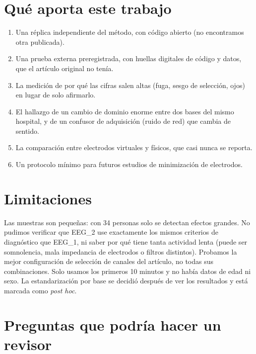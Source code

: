 \documentclass[11pt,letterpaper]{article}
\begin{document}
\section{Qué aporta este trabajo}

\begin{enumerate}[itemsep=2pt]
\item Una réplica independiente del método, con código abierto (no encontramos otra publicada).
\item Una prueba externa preregistrada, con huellas digitales de código y datos, que el artículo original no tenía.
\item La medición de por qué las cifras salen altas (fuga, sesgo de selección, ojos) en lugar de solo afirmarlo.
\item El hallazgo de un cambio de dominio enorme entre dos bases del mismo hospital, y de un confusor de adquisición (ruido de red) que cambia de sentido.
\item La comparación entre electrodos virtuales y físicos, que casi nunca se reporta.
\item Un protocolo mínimo para futuros estudios de minimización de electrodos.
\end{enumerate}

\section{Limitaciones}

Las muestras son pequeñas: con 34 personas solo se detectan efectos grandes. No pudimos verificar que EEG\_2 use exactamente los mismos criterios de diagnóstico que EEG\_1, ni saber por qué tiene tanta actividad lenta (puede ser somnolencia, mala impedancia de electrodos o filtros distintos). Probamos la mejor configuración de selección de canales del artículo, no todas sus combinaciones. Solo usamos los primeros 10 minutos y no había datos de edad ni sexo. La estandarización por base se decidió después de ver los resultados y está marcada como \emph{post hoc}.

\section{Preguntas que podría hacer un revisor}
\end{document}
